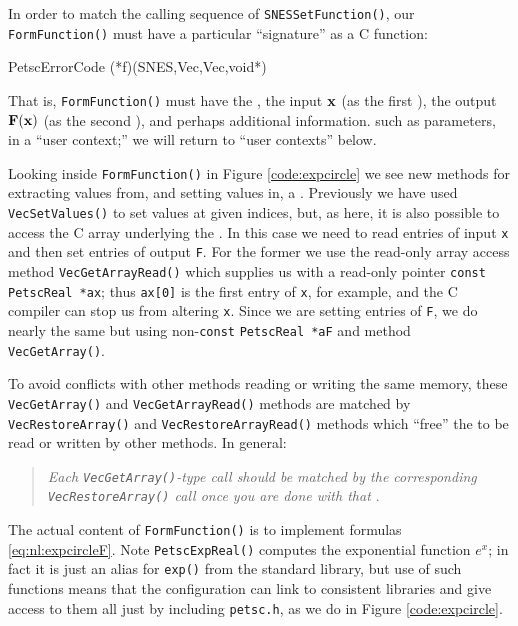 In order to match the calling sequence of \texttt{SNESSetFunction()}, our \texttt{FormFunction()} must have a particular ``signature'' as a C function:
\begin{code}
PetscErrorCode (*f)(SNES,Vec,Vec,void*)
\end{code}
That is, \texttt{FormFunction()} must have the \pSNES, the input $\mathbf{x}$ (as the first \pVec), the output $\mathbf{F}(\mathbf{x})$ (as the second \pVec), and perhaps additional information. such as parameters, in a ``user context;'' we will return to ``user contexts'' below.

Looking inside \texttt{FormFunction()} in Figure \ref{code:expcircle} we see new methods for extracting values from, and setting values in, a \pVec.  Previously we have used \texttt{VecSetValues()} to set values at given indices, but, as here, it is also possible to access the C array underlying the \pVec.  In this case we need to read entries of input \pVec \texttt{x} and then set entries of output \pVec \texttt{F}.  For the former we use the read-only array access method \texttt{VecGetArrayRead()} which supplies us with a read-only pointer \texttt{const PetscReal *ax}; thus \texttt{ax[0]} is the first entry of \pVec \texttt{x}, for example, and the C compiler can stop us from altering \pVec \texttt{x}.  Since we are setting entries of \pVec \texttt{F}, we do nearly the same but using non-\texttt{const} \texttt{PetscReal *aF} and method \texttt{VecGetArray()}.

To avoid conflicts with other methods reading or writing the same memory, these \texttt{VecGetArray()} and \texttt{VecGetArrayRead()} methods are matched by \texttt{VecRestoreArray()} and \texttt{VecRestoreArrayRead()} methods which ``free'' the \pVecs to be read or written by other methods.  In general:
\begin{quote}
\emph{Each \emph{\texttt{VecGetArray()}}-type call should be matched by the corresponding \emph{\texttt{VecRestoreArray()}} call once you are done with that \emph{\pVec}}.
\end{quote}

The actual content of \texttt{FormFunction()} is to implement formulas \eqref{eq:nl:expcircleF}.  Note \texttt{PetscExpReal()} computes the exponential function $e^x$; in fact it is just an alias for \texttt{exp()} from the standard library, but use of such functions means that the \PETSc configuration can link to consistent libraries and give access to them all just by including \texttt{petsc.h}, as we do in Figure \ref{code:expcircle}.

